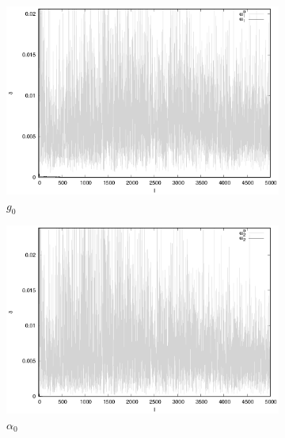 \documentclass[tikz,10pt,a4paper]{article}
\begin{document}
\begin{figure}[h]
  \centering
  \begin{subfigure}[b]{0.35\textwidth}
    \includegraphics[width=\textwidth]{figs/levmar/comparison/comparison_5000_1000_xsigma0.65_float.txt_parameter1.eps}
	\caption{$g_0$}
	\label{fig:comparison_0.65_g0}
  \end{subfigure}%
  \begin{subfigure}[b]{0.35\textwidth}
    \includegraphics[width=\textwidth]{figs/levmar/comparison/comparison_5000_1000_xsigma0.65_float.txt_parameter2.eps}
	\caption{$\alpha_0$}
	\label{fig:comparison_0.65_alpha0}
  \end{subfigure}%
  \begin{subfigure}[b]{0.35\textwidth}

\end{subfigure}
\end{figure}
\end{document}
